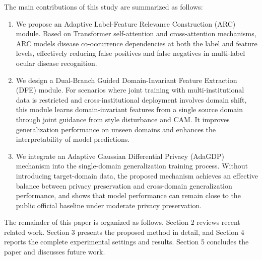 The main contributions of this study are summarized as follows:

\begin{enumerate}
\item We propose an Adaptive Label-Feature Relevance Construction (ARC) module. Based on Transformer self-attention and cross-attention mechanisms, ARC models disease co-occurrence dependencies at both the label and feature levels, effectively reducing false positives and false negatives in multi-label ocular disease recognition.

\item We design a Dual-Branch Guided Domain-Invariant Feature Extraction (DFE) module. For scenarios where joint training with multi-institutional data is restricted and cross-institutional deployment involves domain shift, this module learns domain-invariant features from a single source domain through joint guidance from style disturbance and CAM. It improves generalization performance on unseen domains and enhances the interpretability of model predictions.

\item We integrate an Adaptive Gaussian Differential Privacy (AdaGDP) mechanism into the single-domain generalization training process. Without introducing target-domain data, the proposed mechanism achieves an effective balance between privacy preservation and cross-domain generalization performance, and shows that model performance can remain close to the public official baseline under moderate privacy preservation.
\end{enumerate}

The remainder of this paper is organized as follows. Section 2 reviews recent related work. Section 3 presents the proposed method in detail, and Section 4 reports the complete experimental settings and results. Section 5 concludes the paper and discusses future work.
